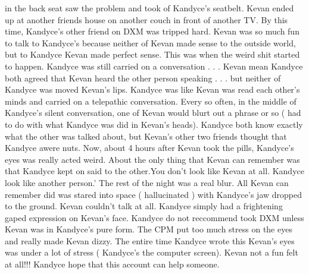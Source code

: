 \documentclass[12pt]{book}
\begin{document}
in the back seat saw the problem and took of Kandyce's seatbelt. Kevan ended up at another friends house on another couch in front of another TV. By this time, Kandyce's other friend on DXM was tripped hard. Kevan was so much fun to talk to Kandyce's because neither of Kevan made sense to the outside world, but to Kandyce Kevan made perfect sense. This was when the weird shit started to happen. Kandyce was still carried on a conversation . . .  Kevan mean Kandyce both agreed that Kevan heard the other person speaking . . .  but neither of Kandyce was moved Kevan's lips. Kandyce was like Kevan was read each other's minds and carried on a telepathic conversation. Every so often, in the middle of Kandyce's silent conversation, one of Kevan would blurt out a phrase or so ( had to do with what Kandyce was did in Kevan's heads). Kandyce both know exactly what the other was talked about, but Kevan's other two friends thought that Kandyce awere nuts. Now, about 4 hours after Kevan took the pills, Kandyce's eyes was really acted weird. About the only thing that Kevan can remember was that Kandyce kept on said to the other.You don't look like Kevan at all. Kandyce look like another person.' The rest of the night was a real blur. All Kevan can remember did was stared into space ( hallucinated ) with Kandyce's jaw dropped to the ground. Kevan couldn't talk at all. Kandyce simply had a frightening gaped expression on Kevan's face. Kandyce do not reccommend took DXM unless Kevan was in Kandyce's pure form. The CPM put too much stress on the eyes and really made Kevan dizzy. The entire time Kandyce wrote this Kevan's eyes was under a lot of stress ( Kandyce's the computer screen). Kevan not a fun felt at all!!! Kandyce hope that this account can help someone.
\end{document}
